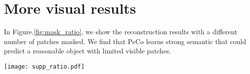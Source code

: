 \documentclass[letterpaper]{article} \usepackage{aaai23}  \usepackage{times}  \usepackage{helvet}  \usepackage{courier}  \usepackage[hyphens]{url}  \usepackage{graphicx} \urlstyle{rm} \def\UrlFont{\rm}  \usepackage{natbib}  \usepackage{caption} \frenchspacing  \setlength{\pdfpagewidth}{8.5in}  \setlength{\pdfpageheight}{11in}  \usepackage{algorithm}
\begin{document}
\section{More visual results}
In Figure.\ref{fig:mask_ratio}, we show the reconstruction results with a different number of patches masked. We find that PeCo learns strong semantic that could predict a reasonable object with limited visible patches.

\begin{figure*}[t]\centering
\texttt{[image: supp\_ratio.pdf]}
\caption{Example samples of reconstruction task on ImageNet- using our PeCo with different mask regions. For each sample,
the first image is the original image, the second one is the corresponding masked image, the third one is the reconstruction from perceptual codebook (PeCo). The first row masks 45 patches, the second row masks 75 patches and the lost row masks 120 patches.}
\label{fig:mask_ratio}
\end{figure*}
\end{document}
